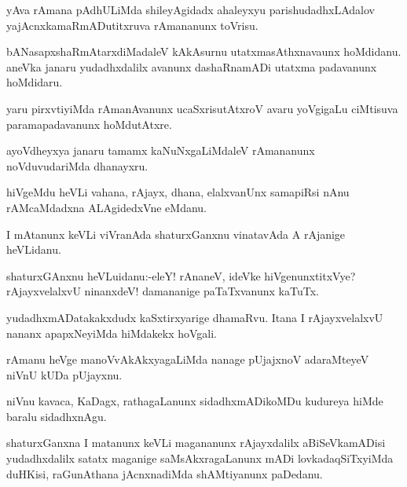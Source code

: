 \documentclass{article}
\begin{document}
\begin{mn}%
yAva rAmana pAdhULiMda shileyAgidadx ahaleyxyu parishudadhxLAdalov 
yajAcnxkamaRmADutitxruva rAmananunx toVrisu.
\end{mn}

\begin{mn}%
bANasapxshaRmAtarxdiMadaleV kAkAsurnu utatxmasAthxnavaunx hoMdidanu. aneVka janaru 
yudadhxdalilx avanunx dashaRnamADi utatxma padavanunx hoMdidaru.
\end{mn}

\begin{mn}%
yaru pirxvtiyiMda rAmanAvanunx ucaSxrisutAtxroV avaru yoVgigaLu ciMtisuva paramapadavanunx 
hoMdutAtxre.
\end{mn}

\begin{mn}%
ayoVdheyxya janaru tamamx kaNuNxgaLiMdaleV rAmananunx noVduvudariMda dhanayxru.
\end{mn}

\begin{mn}%
hiVgeMdu heVLi vahana, rAjayx, dhana, elalxvanUnx samapiRsi nAnu rAMcaMdadxna ALAgidedxVne 
eMdanu.
\end{mn}

\begin{mn}%
I mAtanunx keVLi viVranAda shaturxGanxnu vinatavAda A rAjanige heVLidanu.
\end{mn}

\begin{mn}%
shaturxGAnxnu heVLuidanu:-eleY! rAnaneV, ideVke hiVgenunxtitxVye? rAjayxvelalxvU ninanxdeV!
damananige paTaTxvanunx kaTuTx.
\end{mn}

\begin{mn}%
yudadhxmADatakakxdudx kaSxtirxyarige dhamaRvu. Itana I rAjayxvelalxvU nananx apapxNeyiMda 
hiMdakekx hoVgali.
\end{mn}

\begin{mn}%
rAmanu heVge manoVvAkAkxyagaLiMda nanage pUjajxnoV adaraMteyeV niVnU kUDa pUjayxnu.
\end{mn}

\begin{mn}%
niVnu kavaca, KaDagx, rathagaLanunx sidadhxmADikoMDu kudureya hiMde baralu sidadhxnAgu.
\end{mn}

\begin{mn}%
shaturxGanxna I matanunx keVLi magananunx rAjayxdalilx aBiSeVkamADisi yudadhxdalilx satatx
maganige saMsAkxragaLanunx mADi lovkadaqSiTxyiMda duHKisi, raGunAthana jAcnxnadiMda 
shAMtiyanunx paDedanu.
\end{mn}
\end{document}

